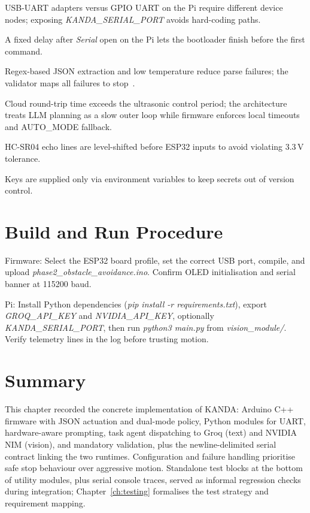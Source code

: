 \begin{description}[style=nextline]
  \item[Serial bring-up] USB-UART adapters versus GPIO UART on the Pi require different device nodes; exposing \textit{KANDA\_SERIAL\_PORT} avoids hard-coding paths.

  \item[ESP32 reset on open] A fixed delay after \textit{Serial} open on the Pi lets the bootloader finish before the first command.

  \item[Non-JSON or fenced LLM output] Regex-based JSON extraction and low temperature reduce parse failures; the validator maps all failures to stop~\cite{huang2023grounded}.

  \item[Stochastic latency] Cloud round-trip time exceeds the ultrasonic control period; the architecture treats LLM planning as a slow outer loop while firmware enforces local timeouts and AUTO\_MODE fallback.

  \item[5\,V sensor echoes] HC-SR04 echo lines are level-shifted before ESP32 inputs to avoid violating 3.3\,V tolerance.

  \item[API credentials] Keys are supplied only via environment variables to keep secrets out of version control.
\end{description}

\section{Build and Run Procedure}
\label{sec:run}

Firmware: Select the ESP32 board profile, set the correct USB port, compile, and upload \textit{phase2\_obstacle\_avoidance.ino}. Confirm OLED initialisation and serial banner at 115200 baud.

Pi: Install Python dependencies (\textit{pip install -r requirements.txt}), export \textit{GROQ\_API\_KEY} and \textit{NVIDIA\_API\_KEY}, optionally \textit{KANDA\_SERIAL\_PORT}, then run \textit{python3 main.py} from \textit{vision\_module/}. Verify telemetry lines in the log before trusting motion.

\section{Summary}
\label{sec:ch6summary}

This chapter recorded the concrete implementation of KANDA: Arduino C++ firmware with JSON actuation and dual-mode policy, Python modules for UART, hardware-aware prompting, task agent dispatching to Groq (text) and NVIDIA NIM (vision), and mandatory validation, plus the newline-delimited serial contract linking the two runtimes. Configuration and failure handling prioritise safe stop behaviour over aggressive motion. Standalone test blocks at the bottom of utility modules, plus serial console traces, served as informal regression checks during integration; Chapter~\ref{ch:testing} formalises the test strategy and requirement mapping.
